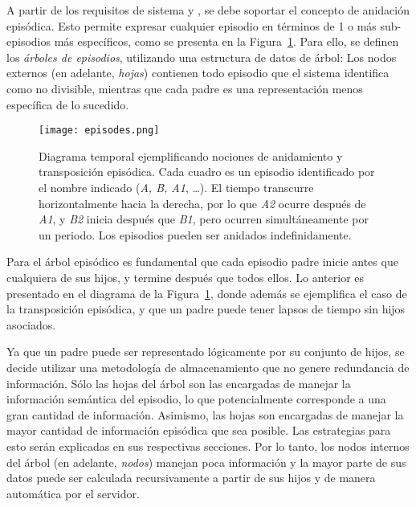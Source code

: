 A partir de los requisitos de sistema  y , se debe soportar el concepto de anidación episódica. Esto permite expresar cualquier episodio en términos de 1 o más sub-episodios más específicos, como se presenta en la Figura~\ref{img:episodes}. Para ello, se definen los \textit{árboles de episodios}, utilizando una estructura de datos de árbol: Los nodos externos (en adelante, \textit{hojas}) contienen todo episodio que el sistema identifica como no divisible, mientras que cada padre es una representación menos específica de lo sucedido.

\begin{figure}[!h]
	\centering
	\texttt{[image: episodes.png]}
	\caption[Concepto de anidamiento y transposición episódica.]
	{\small Diagrama temporal ejemplificando nociones de anidamiento y transposición episódica. Cada cuadro es un episodio identificado por el nombre indicado (\textit{A, B, A1}, \ldots). El tiempo transcurre horizontalmente hacia la derecha, por lo que \textit{A2} ocurre después de \textit{A1}, y \textit{B2} inicia después que \textit{B1}, pero ocurren simultáneamente por un periodo. Los episodios pueden ser anidados indefinidamente.}
	\label{img:episodes}
\end{figure}

Para el árbol episódico es fundamental que cada episodio padre inicie antes que cualquiera de sus hijos, y termine después que todos ellos. Lo anterior es presentado en el diagrama de la Figura~\ref{img:episodes}, donde además se ejemplifica el caso de la transposición episódica, y que un padre puede tener lapsos de tiempo sin hijos asociados.

Ya que un padre puede ser representado lógicamente por su conjunto de hijos, se decide utilizar una metodología de almacenamiento que no genere redundancia de información. Sólo las hojas del árbol son las encargadas de manejar la información semántica del episodio, lo que potencialmente corresponde a una gran cantidad de información. Asimismo, las hojas son encargadas de manejar la mayor cantidad de información episódica que sea posible. Las estrategias para esto serán explicadas en sus respectivas secciones. Por lo tanto, los nodos internos del árbol (en adelante, \textit{nodos}) manejan poca información y la mayor parte de sus datos puede ser calculada recursivamente a partir de sus hijos y de manera automática por el servidor.

